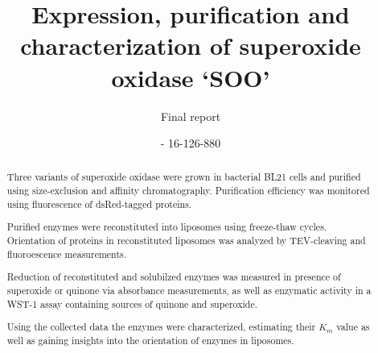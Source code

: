\documentclass[a4paper,overfullrule=true,9pt]{scrartcl}
\title{Expression, purification and characterization of superoxide oxidase `SOO'}
\subtitle{Final report}
\author{\maillink{michael.senn@students.unibe.ch}{Michael Senn} - 16-126-880}
\date{\printdate}
\begin{document}
\maketitle

\begin{abstract}
	Three variants of superoxide oxidase were grown in bacterial BL21 cells
	and purified using size-exclusion and affinity chromatography.
	Purification efficiency was monitored using fluorescence of
	dsRed-tagged proteins.

	Purified enzymes were reconstituted into liposomes using freeze-thaw
	cycles. Orientation of proteins in reconstituted liposomes was analyzed
	by TEV-cleaving and fluoroescence measurements. 

	Reduction of reconstituted and solubilzed enzymes was measured in
	presence of superoxide or quinone via absorbance measurements, as well
	as enzymatic activity in a WST-1 assay containing sources of quinone
	and superoxide.

	Using the collected data the enzymes were characterized, estimating
	their $K_m$ value as well as gaining insights into the orientation of
	enzymes in liposomes.
\end{abstract}









\newpage


\end{document}
